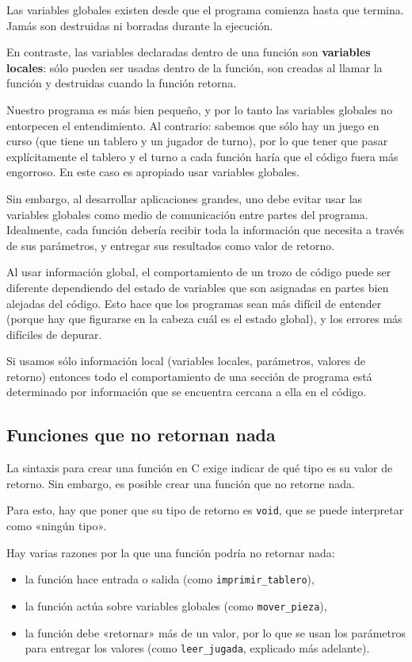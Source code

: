 Las variables globales existen desde que el programa comienza hasta que
termina. Jamás son destruidas ni borradas durante la ejecución.

En contraste, las variables declaradas dentro de una función son
\textbf{variables locales}: sólo pueden ser usadas dentro de la función,
son creadas al llamar la función y destruidas cuando la función retorna.

Nuestro programa es más bien pequeño, y por lo tanto las variables
globales no entorpecen el entendimiento. Al contrario: sabemos que sólo
hay un juego en curso (que tiene un tablero y un jugador de turno), por
lo que tener que pasar explícitamente el tablero y el turno a cada
función haría que el código fuera más engorroso. En este caso es
apropiado usar variables globales.

Sin embargo, al desarrollar aplicaciones grandes, uno debe evitar usar
las variables globales como medio de comunicación entre partes del
programa. Idealmente, cada función debería recibir toda la información
que necesita a través de sus parámetros, y entregar sus resultados como
valor de retorno.

Al usar información global, el comportamiento de un trozo de código
puede ser diferente dependiendo del estado de variables que son
asignadas en partes bien alejadas del código. Esto hace que los
programas sean más difícil de entender (porque hay que figurarse en la
cabeza cuál es el estado global), y los errores más difíciles de
depurar.

Si usamos sólo información local (variables locales, parámetros, valores
de retorno) entonces todo el comportamiento de una sección de programa
está determinado por información que se encuentra cercana a ella en el
código.

\subsection{Funciones que no retornan nada}

La sintaxis para crear una función en C exige indicar de qué tipo es su
valor de retorno. Sin embargo, es posible crear una función que no
retorne nada.

Para esto, hay que poner que su tipo de retorno es \lstinline!void!, que
se puede interpretar como «ningún tipo».

Hay varias razones por la que una función podría no retornar nada:

\begin{itemize}
\item
  la función hace entrada o salida (como \lstinline!imprimir_tablero!),
\item
  la función actúa sobre variables globales (como
  \lstinline!mover_pieza!),
\item
  la función debe «retornar» más de un valor, por lo que se usan los
  parámetros para entregar los valores (como \lstinline!leer_jugada!,
  explicado más adelante).
\end{itemize}

